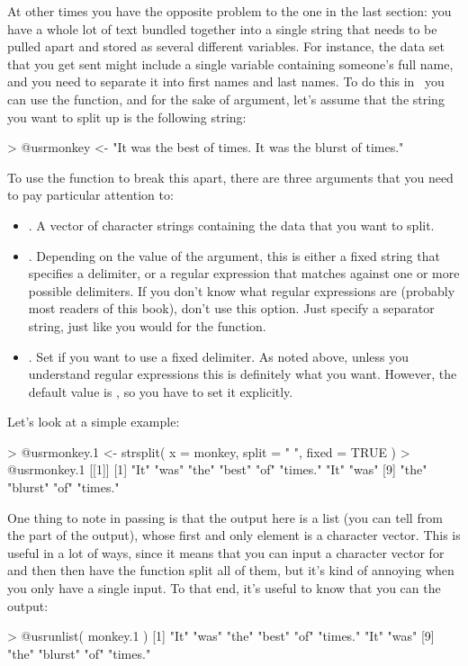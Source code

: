 At other times you have the opposite problem to the one in the last section: you have a whole lot of text bundled together into a single string that needs to be pulled apart and stored as several different variables. For instance, the data set that you get sent might include a single variable containing someone's full name, and you need to separate it into first names and last names. To do this in \R\ you can use the  function, and for the sake of argument, let's assume that the string you want to split up is the following string:
\begin{rblock1}
> @usr{monkey <- "It was the best of times. It was the blurst of times."}
\end{rblock1}
To use the  function to break this apart, there are three arguments that you need to pay particular attention to:
\begin{itemize} \itemsep 0pt
\item {}. A vector of character strings containing the data that you want to split.
\item {}. Depending on the value of the  argument, this is either a fixed string that specifies a delimiter, or a regular expression that matches against one or more possible delimiters. If you don't know what regular expressions are (probably most readers of this book), don't use this option. Just specify a separator string, just like you would for the  function.
\item {}. Set  if you want to use a fixed delimiter. As noted above, unless you understand regular expressions this is definitely what you want. However, the default value is , so you have to set it explicitly.
\end{itemize}
Let's look at a simple example:
\begin{rblock1}
> @usr{monkey.1 <- strsplit( x = monkey, split = " ", fixed = TRUE )}
> @usr{monkey.1}
[[1]]
 [1] "It"     "was"    "the"    "best"   "of"     "times." "It"     "was"   
 [9] "the"    "blurst" "of"     "times."
\end{rblock1}
One thing to note in passing is that the output here is a list (you can tell from the \rtextoutput{[[1]]} part of the output), whose first and only element is a character vector. This is useful in a lot of ways, since it means that you can input a character vector for  and then then have the  function split all of them, but it's kind of annoying when you only have a single input. To that end, it's useful to know that you can  the output:
\begin{rblock1}
> @usr{unlist( monkey.1 )}
 [1] "It"     "was"    "the"    "best"   "of"     "times." "It"     "was"   
 [9] "the"    "blurst" "of"     "times."
\end{rblock1}

